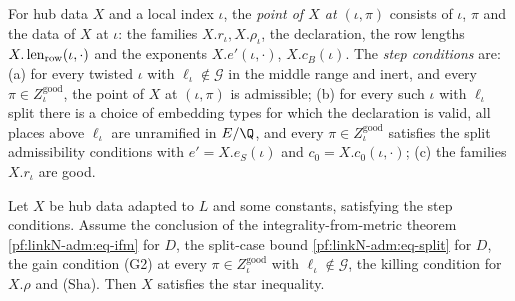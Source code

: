For hub data $X$ and a local index $\iota$, the \emph{point of $X$ at $(\iota,\pi)$} consists of $\iota$, $\pi$ and the
data of $X$ at $\iota$: the families $X.r_\iota,X.\rho_\iota$, the declaration, the row lengths
$X.\operatorname{len}_{\mathrm{row}}(\iota,\cdot)$ and the exponents $X.e'(\iota,\cdot)$, $X.c_B(\iota)$. The \emph{step
conditions} are: (a) for every twisted $\iota$ with $\ell_\iota\notin\mathcal G$ in the middle range and inert, and every
$\pi\in Z^{\mathrm{good}}_\iota$, the point of $X$ at $(\iota,\pi)$ is admissible; (b) for every such $\iota$ with
$\ell_\iota$ split there is a choice of embedding types for which the declaration is valid, all places above $\ell_\iota$
are unramified in $E/\Q$, and every $\pi\in Z^{\mathrm{good}}_\iota$ satisfies the split admissibility conditions with
$e'=X.e_S(\iota)$ and $c_0=X.c_0(\iota,\cdot)$; (c) the families $X.r_\iota$ are good.

\begin{proposition}\label{pf:linkN-adm:star}
Let $X$ be hub data adapted to $L$ and some constants, satisfying the step conditions. Assume the conclusion of the
integrality-from-metric theorem \eqref{pf:linkN-adm:eq-ifm} for $D$, the split-case bound \eqref{pf:linkN-adm:eq-split}
for $D$, the gain condition (G2) at every $\pi\in Z^{\mathrm{good}}_\iota$ with $\ell_\iota\notin\mathcal G$,
the killing condition for $X.\rho$ and (Sha). Then $X$ satisfies the star inequality.
\end{proposition}

